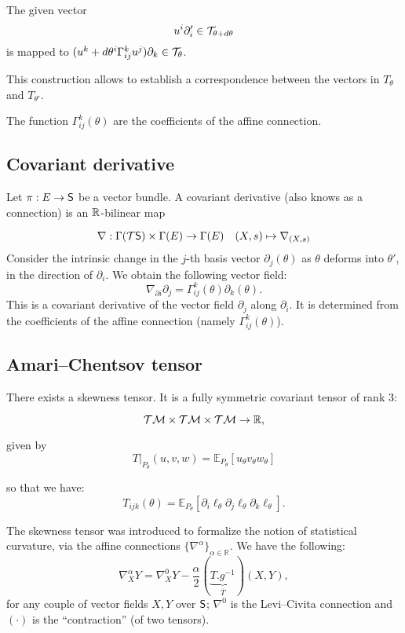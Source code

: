 {The given vector $$u^i\partial'_i \in \mathcal{T}_{\theta+d\theta}$$ is mapped to $(u^k+d\theta^i\Gamma_{ij}^ku^j)\partial_k\in\mathcal{T}_{\theta}$. 

This construction allows to establish a correspondence between the vectors in $T_{\theta}$ and $T_{\theta'}$.

The function $\Gamma_{ij}^k(\theta)$ are the coefficients of the affine connection.

\subsection{Covariant derivative}

Let $\pi:E\to \mathsf{S}$ be a vector bundle. A covariant derivative (also knows as a connection) is an $\mathbb{R}$-bilinear map 

\[
\nabla: \Gamma(\mathcal{T}\mathsf{S})\times \Gamma(E)\to \Gamma(E) \quad (X,s)\mapsto \nabla_{(X,s)}
\]
Consider the intrinsic change in the $j$-th basis vector $\partial_j (\theta)$ as $\theta$ deforms into $\theta'$, 
in the direction of $\partial_i$. We obtain the following vector field:
\[
\nabla_{\partial i}\partial_j=\Gamma_{ij}^k(\theta)\partial_k(\theta).
\]
This is a covariant derivative of the vector field $\partial_j$ along $\partial_i$. It is determined from the coefficients of the affine connection (namely $\Gamma_{ij}^k(\theta)$).

\subsection{Amari--Chentsov tensor}

There exists a skewness tensor. It is a fully symmetric covariant tensor of rank 3: 

\[\mathcal{T}\mathcal{M} \times \mathcal{T}\mathcal{M} \times \mathcal{T}\mathcal{M}\to \mathbb{R},\] 

given by \[ T|_{P_{\theta}}(u,v,w)= \mathbb{E}_{P_{\theta}}[u_{\theta}v_{\theta}w_{\theta}] \] 

so that we have:  \[T_{ijk}(\theta)=\mathbb{E}_{P_{\theta}}[\partial_i\ell_{\theta}\partial_j\ell_{\theta}\partial_k\ell_{\theta}].\]


The skewness tensor was introduced to formalize the notion of statistical curvature, via the affine connections $\{\nabla^{\alpha}\}_{\alpha\in \mathbb{R}}$. 
We have the following:
\[\nabla^{\alpha}_{X}Y= \nabla^{0}_{X}Y- \frac{\alpha}{2}(\underbrace{T.g^{-1}}_{\overline{T}})(X,Y),\]
 for any couple of vector fields $X, Y$ over $\mathsf{S}$; 
$\nabla^{0}$ is the Levi--Civita connection and $(\cdot)$ is the “contraction” (of two tensors).   

}

